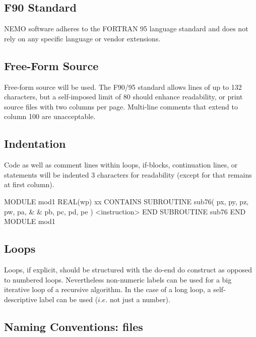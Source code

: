 \documentclass{article}
\begin{document}
\subsection{F90 Standard}

NEMO software adheres to the FORTRAN 95 language standard and does not rely on any specific language or
vendor extensions.


\subsection{Free-Form Source}

Free-form source will be used.
The F90/95 standard allows lines of up to 132 characters, but a self-imposed limit of 80 should enhance readability,
or print source files with two columns per page.
Multi-line comments that extend to column 100 are unacceptable.

\subsection{Indentation}

Code as well as comment lines within loops, if-blocks, continuation lines,  or
 statements will be indented 3 characters for readability
(except for  that remains at first column).

\begin{forlines}
MODULE mod1
   REAL(wp) xx
CONTAINS
   SUBROUTINE sub76( px, py, pz, pw, pa,   &
      &              pb, pc, pd, pe          )
      <instruction>
   END SUBROUTINE sub76
END MODULE mod1
\end{forlines}

\subsection{Loops}

Loops, if explicit, should be structured with the do-end do construct as opposed to numbered loops.
Nevertheless non-numeric labels can be used for a big iterative loop of a recursive algorithm.
In the case of a long loop, a self-descriptive label can be used ($i.e.$ not just a number).

\subsection{Naming Conventions: files}
\end{document}
